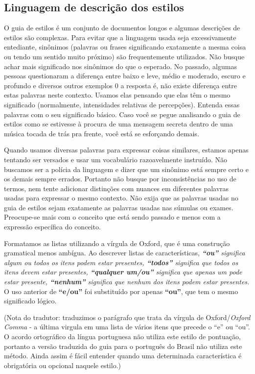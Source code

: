 \subsection*{Linguagem de descrição dos estilos}

O guia de estilos é um conjunto de documentos longos e algumas descrições de estilos são complexas. Para evitar que a linguagem usada seja excessivamente entediante, sinônimos (palavras ou frases significando exatamente a mesma coisa ou tendo um sentido muito próximo) são frequentemente utilizados. Não busque achar mais significado nos sinônimos do que o esperado. No passado, algumas pessoas questionaram a diferença entre baixo e leve, médio e moderado, escuro e profundo e diversos outros exemplos 0 a resposta é, não existe diferença entre estas palavras neste contexto. Usamos elas pensando que elas têm o mesmo significado (normalmente, intensidades relativas de percepções). Entenda essas palavras com o seu significado básico. Caso você se pegue analisando o guia de estilos como se estivesse à procura de uma mensagem secreta dentro de uma música tocada de trás pra frente, você está se esforçando demais.

Quando usamos diversas palavras para expressar coisas similares, estamos apenas tentando ser versados e usar um vocabulário razoavelmente instruído. Não buscamos ser a polícia da linguagem e dizer que um sinônimo está sempre certo e os demais sempre errados. Portanto não busque por inconsistências no uso de termos, nem tente adicionar distinções com nuances em diferentes palavras usadas para expressar o mesmo contexto. Não exija que as palavras usadas no guia de estilos sejam exatamente as palavras usadas nas súmulas ou exames. Preocupe-se mais com o conceito que está sendo passado e menos com a expressão específica do conceito.

Formatamos as listas utilizando a vírgula de Oxford, que é uma construção gramatical menos ambígua. Ao descrever listas de características, \textit{\textbf{“ou”} significa algum ou todos os itens podem estar presentes, \textbf{“todos”} significa que todos os itens devem estar presentes, \textbf{“qualquer um/ou”} significa que apenas um pode estar presente, \textbf{“nenhum”} significa que nenhum dos itens podem estar presentes.} O uso anterior de \textbf{“e/ou”} foi substituído por apenas \textbf{“ou”}, que tem o mesmo significado lógico.

(Nota do tradutor: traduzimos o parágrafo que trata da vírgula de Oxford/\textit{Oxford Comma} - a última virgula em uma lista de vários itens que precede o “e” ou “ou”. O acordo ortográfico da língua portuguesa não utiliza este estilo de pontuação, portanto a versão traduzida do guia para o português do Brasil não utiliza este método. Ainda assim é fácil entender quando uma determinada característica é obrigatória ou opcional naquele estilo.)

